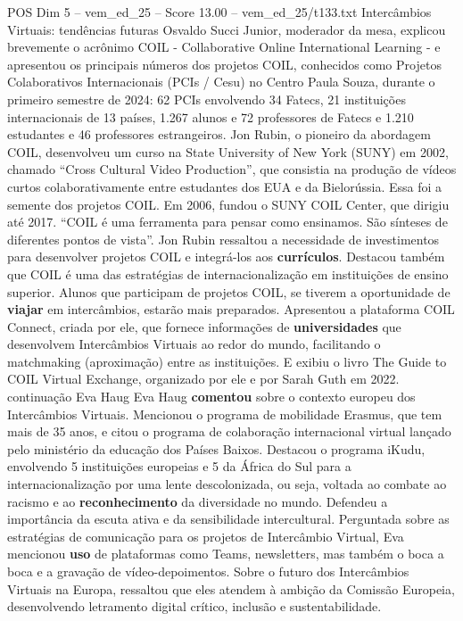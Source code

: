 \begin{textsample}{POS Dim 5 – vem\_ed\_25 – Score 13.00 – vem\_ed\_25/t133.txt}  \label{ex:f5_pos_017}
Intercâmbios Virtuais: tendências futuras Osvaldo Succi Junior, moderador da mesa, explicou brevemente o acrônimo COIL - Collaborative Online International Learning - e apresentou os principais números dos projetos COIL, conhecidos como Projetos Colaborativos Internacionais (PCIs / Cesu) no Centro Paula Souza, durante o primeiro semestre de 2024: 62 PCIs envolvendo 34 Fatecs, 21 instituições internacionais de 13 países, 1.267 alunos e 72 professores de Fatecs e 1.210 estudantes e 46 professores estrangeiros.
Jon Rubin, o pioneiro da abordagem COIL, desenvolveu um curso na State University of New York (SUNY) em 2002, chamado “Cross Cultural Video Production”, que consistia na produção de vídeos curtos colaborativamente entre estudantes dos EUA e da Bielorússia.
Essa foi a semente dos projetos COIL.
Em 2006, fundou o SUNY COIL Center, que dirigiu até 2017. “COIL é uma ferramenta para pensar como ensinamos.
São sínteses de diferentes pontos de vista”.
Jon Rubin ressaltou a necessidade de investimentos para desenvolver projetos COIL e integrá-los aos \textbf{currículos}.
Destacou também que COIL é uma das estratégias de internacionalização em instituições de ensino superior.
Alunos que participam de projetos COIL, se tiverem a oportunidade de \textbf{viajar} em intercâmbios, estarão mais preparados.
Apresentou a plataforma COIL Connect, criada por ele, que fornece informações de \textbf{universidades} que desenvolvem Intercâmbios Virtuais ao redor do mundo, facilitando o matchmaking (aproximação) entre as instituições.
E exibiu o livro The Guide to COIL Virtual Exchange, organizado por ele e por Sarah Guth em 2022. continuação Eva Haug Eva Haug \textbf{comentou} sobre o contexto europeu dos Intercâmbios Virtuais.
Mencionou o programa de mobilidade Erasmus, que tem mais de 35 anos, e citou o programa de colaboração internacional virtual lançado pelo ministério da educação dos Países Baixos.
Destacou o programa iKudu, envolvendo 5 instituições europeias e 5 da África do Sul para a internacionalização por uma lente descolonizada, ou seja, voltada ao combate ao racismo e ao \textbf{reconhecimento} da diversidade no mundo.
Defendeu a importância da escuta ativa e da sensibilidade intercultural.
Perguntada sobre as estratégias de comunicação para os projetos de Intercâmbio Virtual, Eva mencionou \textbf{uso} de plataformas como Teams, newsletters, mas também o boca a boca e a gravação de vídeo-depoimentos.
Sobre o futuro dos Intercâmbios Virtuais na Europa, ressaltou que eles atendem à ambição da Comissão Europeia, desenvolvendo letramento digital crítico, inclusão e sustentabilidade.

\end{textsample}
